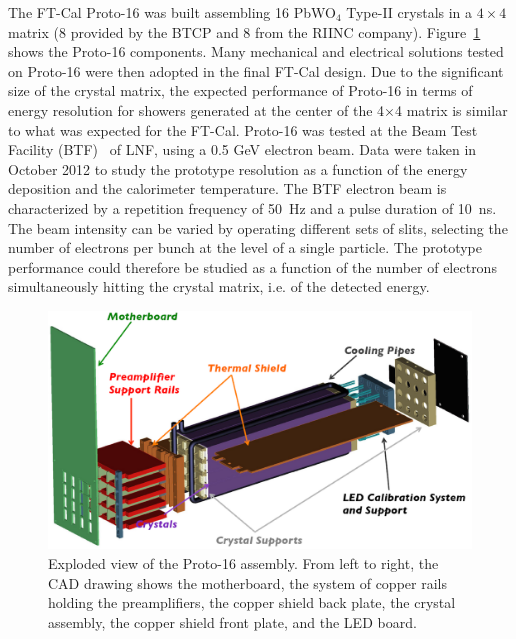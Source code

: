 The FT-Cal Proto-16 was built assembling 16 PbWO$_4$ Type-II crystals in a $4\times4$ matrix (8 provided by the
BTCP and 8 from the RIINC company). Figure~\ref{fig:p16-whole} shows the Proto-16 components. Many mechanical
and electrical solutions tested on Proto-16 were then adopted in the final FT-Cal design. Due to the significant size
of the crystal matrix, the expected performance of Proto-16 in terms of energy resolution for showers generated at
the center of the 4$\times$4 matrix is similar to what was expected for the FT-Cal. Proto-16 was tested at the Beam
Test Facility (BTF)~\cite{btf} of LNF, using a 0.5 GeV electron beam. Data were taken in October 2012 to study
the prototype resolution as a function of the energy deposition and the calorimeter temperature. The BTF electron
beam is characterized by a repetition frequency of 50~Hz and a pulse duration of 10~ns. The beam intensity can be
varied by operating different sets of slits, selecting the number of electrons per bunch at the level of a single
particle. The prototype performance could therefore be studied as a function of the number of electrons 
simultaneously hitting the crystal matrix, i.e. of the detected energy.

\begin{figure}
\includegraphics[width=1.0\columnwidth]{./fig/p16-whole.eps}
\caption{Exploded view of the Proto-16 assembly. From left to right, the CAD drawing shows the motherboard, the
  system of copper rails holding the preamplifiers, the copper shield back plate, the crystal assembly, the copper
  shield front plate, and the LED board.}
\label{fig:p16-whole}
\end{figure}

